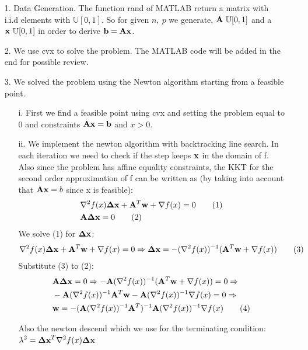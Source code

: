 \documentclass[12pt]{article}
\newcommand\numberthis{\addtocounter{equation}{1}\tag{\theequation}}
\begin{document}
	\begin{enumerate}
		\item[1.]
		Data Generation. The function rand of MATLAB return a matrix with i.i.d elements with $\mathbb{U}[0,1]$. So for given $n,\ p$ we generate, ${\bf A}~\mathbb{U}[0,1]$ and a ${\bf x}~\mathbb{U}[0,1]$ in order to derive ${\bf b}={\bf A}{\bf x}$.
		
		\item[2.]
		We use cvx to solve the problem. The MATLAB code will be added in the end for possible review.
		
		\item[3.]
		We solved the problem using the Newton algorithm starting from a feasible point.
		\begin{enumerate}
			\item[i.]
			First we find a feasible point using cvx and setting the problem equal to 0 and constraints ${\bf A}{\bf x}={\bf b}$ and ${x>0}$.
			
			\item[ii.]
			We implement the newton algorithm with backtracking line search.
			In each iteration we need to check if the step keeps ${\bf x}$ in the domain of f.
			Also since the problem has affine equality constraints, the KKT for the second order approximation of f can be written as (by taking into account that ${\bf A}{\bf x}=b$ since x is feasible):
			\begin{align*}
				&\nabla^2f(x){\bf \Delta x} + {\bf A}^T{\bf w} + \nabla f(x)=0 \numberthis\\
				&{\bf A}{\bf \Delta x}=0 \numberthis
			\end{align*}
			We solve (1) for ${\bf \Delta x}$:
			\begin{align*}
				\nabla^2f(x){\bf \Delta x} + {\bf A}^T{\bf w} + \nabla f(x)=0 \Rightarrow {\bf \Delta x}=-(\nabla^2f(x))^{-1}({\bf A}^T{\bf w} + \nabla f(x))\numberthis
			\end{align*}
			Substitute (3) to (2):
			\begin{align*}
				&{\bf A}{\bf \Delta x}=0 \Rightarrow -{\bf A}(\nabla^2f(x))^{-1}({\bf A}^T{\bf w} + \nabla f(x))=0\Rightarrow\\
				&-{\bf A}(\nabla^2f(x))^{-1}{\bf A}^T{\bf w}-{\bf A}(\nabla^2f(x))^{-1}\nabla f(x)=0\Rightarrow\\
				&{\bf w}=-({\bf A}(\nabla^2f(x))^{-1}{\bf A}^T)^{-1}{\bf A}(\nabla^2f(x))^{-1}\nabla f(x) \numberthis
			\end{align*}
			
			Also the newton descend which we use for the terminating condition:\\
			$\displaystyle \lambda^2={\bf \Delta x}^T\nabla^2f(x){\bf \Delta x}$
			

\end{enumerate}
\end{enumerate}
\end{document}

